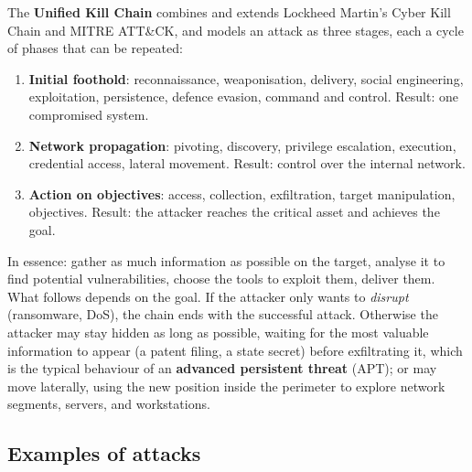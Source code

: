 The \textbf{Unified Kill Chain} \cite{pols2017} combines and extends Lockheed Martin's Cyber Kill Chain and MITRE ATT\&CK, and models an attack as three stages, each a cycle of phases that can be repeated:
\begin{enumerate}
    \item \textbf{Initial foothold}: reconnaissance, weaponisation, delivery, social engineering, exploitation, persistence, defence evasion, command and control. Result: one compromised system.
    \item \textbf{Network propagation}: pivoting, discovery, privilege escalation, execution, credential access, lateral movement. Result: control over the internal network.
    \item \textbf{Action on objectives}: access, collection, exfiltration, target manipulation, objectives. Result: the attacker reaches the critical asset and achieves the goal.
\end{enumerate}

In essence: gather as much information as possible on the target, analyse it to find potential vulnerabilities, choose the tools to exploit them, deliver them. What follows depends on the goal. If the attacker only wants to \emph{disrupt} (ransomware, DoS), the chain ends with the successful attack. Otherwise the attacker may stay hidden as long as possible, waiting for the most valuable information to appear (a patent filing, a state secret) before exfiltrating it, which is the typical behaviour of an \textbf{advanced persistent threat} (APT); or may move laterally, using the new position inside the perimeter to explore network segments, servers, and workstations.

\subsection{Examples of attacks}

